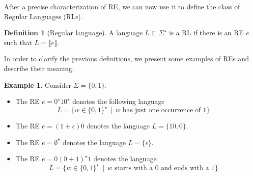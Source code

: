 \documentclass[oneside,12pt]{scrbook}
\theoremstyle{definition}
\newtheorem{Example}{Example}
\newcommand{\sembrackets}[1]{\ensuremath{\llbracket #1 \rrbracket}}
\theoremstyle{plain}
\theoremstyle{definition}
\newtheorem{Definition}{Definition}
\begin{document}
After a precise characterization of RE, we can now use it to define the class of Regular Languages (RLs).

\begin{Definition}[Regular language]
	A language $L \subseteq \Sigma^\star$ is a RL if there is an RE 
	$e$ such that $L = \sembrackets{e}$.
\end{Definition}

In order to clarify the previous definitions, we present some examples of REs and describe their meaning.

\begin{Example}
	Consider $\Sigma =\{0,1\}$.
	\begin{itemize}
		\item The RE $e = 0^\star 10^\star$ denotes the following language
		\begin{equation*}L =\{w \in\{0,1\}^\star\,\mid\,w \text{ has just one occurrence of }1\}\end{equation*}
		\item The RE $e =(1 + \epsilon)0$ denotes the language $L = \{10, 0\}$.
		\item The RE $e = \emptyset^\star$ denotes the language $L = \{\epsilon\}$.
		\item The RE $e = 0(0 + 1)^\star 1$ denotes the language
		\begin{equation*}L =\{w \in\{0,1\}^\star\,\mid\,w \text{ starts with a 0 and ends with a 1}\}\end{equation*}
	\end{itemize}
\end{Example}
\end{document}
